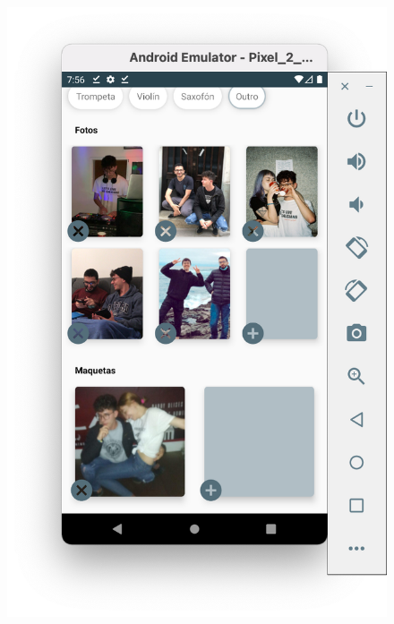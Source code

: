 \documentclass[a4paper,12pt]{article}
\begin{document}
\begin{figure}[H]
	\centering
	\includegraphics[scale=.42]{7.png}
\end{figure}
\end{document}
